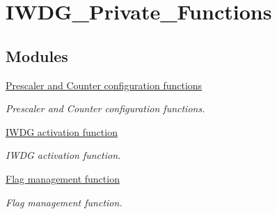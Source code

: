 \hypertarget{group___i_w_d_g___private___functions}{\section{I\-W\-D\-G\-\_\-\-Private\-\_\-\-Functions}
\label{group___i_w_d_g___private___functions}
}
\subsection*{Modules}
\begin{DoxyCompactItemize}
\item 
\hyperlink{group___i_w_d_g___group1}{Prescaler and Counter configuration functions}
\begin{DoxyCompactList}\small\item\em Prescaler and Counter configuration functions. \end{DoxyCompactList}\item 
\hyperlink{group___i_w_d_g___group2}{I\-W\-D\-G activation function}
\begin{DoxyCompactList}\small\item\em I\-W\-D\-G activation function. \end{DoxyCompactList}\item 
\hyperlink{group___i_w_d_g___group3}{Flag management function}
\begin{DoxyCompactList}\small\item\em Flag management function. \end{DoxyCompactList}\end{DoxyCompactItemize}
